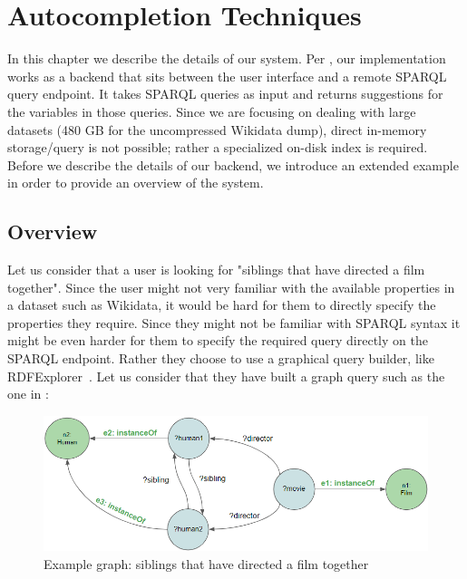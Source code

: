 \chapter{Autocompletion Techniques}
\label{chap:Backend}

In this chapter we describe the details of our system. Per , our implementation works as a backend that sits between the user interface and a remote SPARQL query endpoint. It takes SPARQL queries as input and returns suggestions for the variables in those queries. Since we are focusing on dealing with large datasets (480 GB for the uncompressed Wikidata dump), direct in-memory storage/query is not possible; rather a specialized on-disk index is required.  Before we describe the details of our backend, we introduce an extended example in order to provide an overview of the system.

\section{Overview}

Let us consider that a user is looking for "siblings that have directed a film together". 
Since the user might not very familiar with the available properties in a dataset such as Wikidata, it would be hard for them to directly specify the properties they require. Since they might not be familiar with SPARQL syntax it might be even harder for them to specify the required query directly on the SPARQL endpoint. Rather they choose to use a graphical query builder, like RDFExplorer~\cite{Vargas2019}. Let us consider that they have built a graph query such as the one in :

\begin{figure}[H]
    \centering
        \includegraphics[width=\linewidth]{imagenes/SiblingsGraph.png}
        \caption{Example graph: siblings that have directed a film together}
        \label{fig:siblingsQueryGraph}
\end{figure}

